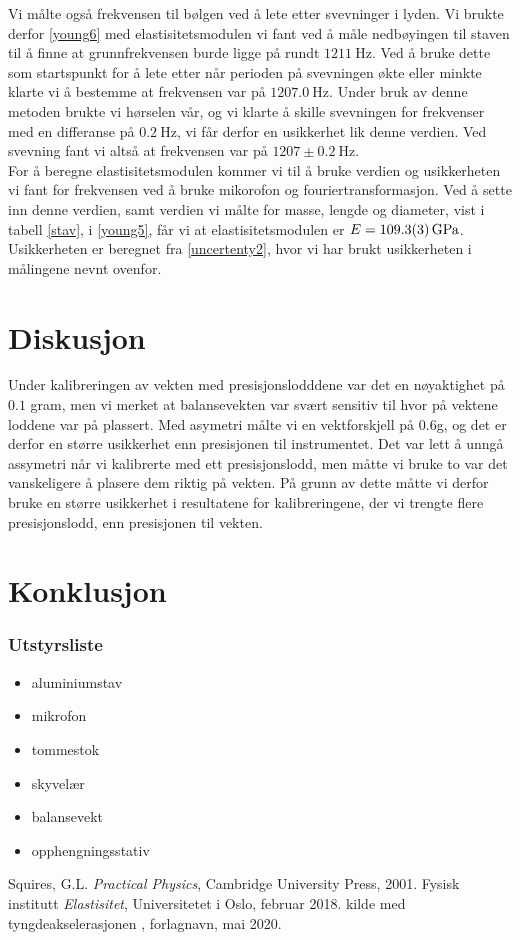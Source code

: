 \documentclass[%
 reprint,
 amsmath,amssymb,
 aps,
]{revtex4-1}
\begin{document}
Vi målte også frekvensen til bølgen ved å lete etter svevninger i lyden. Vi brukte derfor \eqref{young6} med elastisitetsmodulen vi fant ved å måle nedbøyingen til staven til å finne at grunnfrekvensen burde ligge på rundt $\SI{1211}{\hertz}$. Ved å bruke dette som startspunkt for å lete etter når perioden på svevningen økte eller minkte klarte vi å bestemme at frekvensen var på $\SI{1207.0}{\hertz}$. Under bruk av denne metoden brukte vi hørselen vår, og vi klarte å skille svevningen for frekvenser med en differanse på $\SI{0.2}{\hertz}$, vi får derfor en usikkerhet lik denne verdien. Ved svevning fant vi altså at frekvensen var på $1207\pm\SI{0.2}{\hertz}$.\\
For å beregne elastisitetsmodulen kommer vi til å bruke verdien og usikkerheten vi fant for frekvensen ved å bruke mikorofon og fouriertransformasjon. Ved å sette inn denne verdien, samt verdien vi målte for masse, lengde og diameter, vist i tabell \vref{stav}, i \eqref{young5}, får vi at elastisitetsmodulen er $E = \SI{109.3\pm0.3}{\giga\pascal}$. Usikkerheten er beregnet fra \eqref{uncertenty2}, hvor vi har brukt usikkerheten i målingene nevnt ovenfor.
\section{Diskusjon}
Under kalibreringen av vekten med presisjonslodddene var det en nøyaktighet på $0.1$ gram, men vi merket at balansevekten var svært sensitiv til hvor på vektene loddene var på plassert. Med asymetri målte vi en vektforskjell på $0.6$g, og det er derfor en større usikkerhet enn presisjonen til instrumentet. Det var lett å unngå assymetri når vi kalibrerte med ett presisjonslodd, men måtte vi bruke to var det vanskeligere å plasere dem riktig på vekten. På grunn av dette måtte vi derfor bruke en større usikkerhet i resultatene for kalibreringene, der vi trengte flere presisjonslodd, enn presisjonen til vekten.
\section{Konklusjon}
\subsubsection*{Utstyrsliste}
\begin{itemize}
\label{utstyr}
\item aluminiumstav
\item mikrofon
\item tommestok
\item skyvelær
\item balansevekt
\item opphengningsstativ
\end{itemize}
\begin{thebibliography}{9}
Squires, G.L. \emph{Practical Physics}, Cambridge University Press, 2001.
Fysisk institutt \emph{Elastisitet}, Universitetet i Oslo, februar 2018.
kilde med tyngdeakselerasjonen , forlagnavn, mai 2020.
\end{thebibliography}
\end{document}
